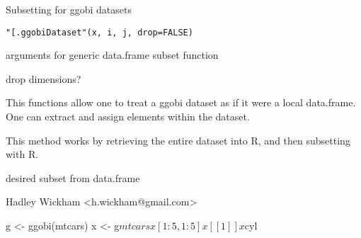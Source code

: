 \documentclass{article}
\begin{document}
\HeaderA{"[.ggobiDataset"}{Subsettting}{"[.ggobiDataset"}
\aliasA{\$.ggobiDataset}{"[.ggobiDataset"}{.Rdol..ggobiDataset}
\aliasA{[.ggobiDataset}{"[.ggobiDataset"}{[.ggobiDataset}
\aliasA{[[.ggobiDataset}{"[.ggobiDataset"}{[[.ggobiDataset}
\keyword{manip}{"[.ggobiDataset"}
\begin{Description}\relax
Subsetting for ggobi datasets
\end{Description}
\begin{Usage}
\begin{verbatim}"[.ggobiDataset"(x, i, j, drop=FALSE)\end{verbatim}
\end{Usage}
\begin{Arguments}
\begin{ldescription}
\item[\code{x}] arguments for generic data.frame subset function
\item[\code{i}] drop dimensions?
\item[\code{j}] 
\item[\code{drop}] 
\end{ldescription}
\end{Arguments}
\begin{Details}\relax
This functions allow one to treat a ggobi dataset as if it were a local
data.frame.  One can extract and assign elements within the dataset.

This method works by retrieving the entire dataset into
R, and then subsetting with R.
\end{Details}
\begin{Value}
desired subset from data.frame
\end{Value}
\begin{Author}\relax
Hadley Wickham <h.wickham@gmail.com>
\end{Author}
\begin{Examples}
\begin{ExampleCode}g <- ggobi(mtcars)
x <- g$mtcars
x[1:5, 1:5]
x[[1]]
x$cyl\end{ExampleCode}
\end{Examples}
\end{document}
